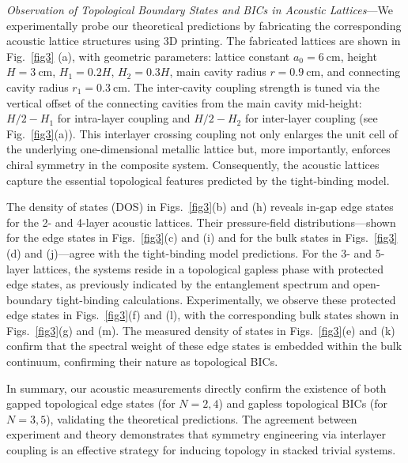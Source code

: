 \documentclass[twocolumn,english,prl,epsfig,rotate,showpacs,aps, superscriptaddress]{revtex4-2}
\newcommand{\blue}{\color{black}}
\begin{document}
\textit{Observation of Topological Boundary States and BICs in Acoustic Lattices}---We experimentally probe our theoretical predictions by fabricating the corresponding acoustic lattice structures using 3D printing. The fabricated lattices are shown in Fig.~\ref{fig3} (a), with geometric parameters: lattice constant $a_0 = 6\ \text{cm}$, height $H = 3\ \text{cm}$, $H_1=0.2H$, $H_2=0.3H$, main cavity radius $r = 0.9\ \text{cm}$, and connecting cavity radius $r_1 = 0.3\ \text{cm}$. The inter-cavity coupling strength is tuned via the vertical offset of the connecting cavities from the main cavity mid-height: $H/2 - H_1$ for intra-layer coupling and $H/2 - H_2$ for inter-layer coupling (see Fig.~\ref{fig3}(a)). This interlayer crossing coupling not only enlarges the unit cell of the underlying one-dimensional metallic lattice but, more importantly, enforces chiral symmetry in the composite system. Consequently, the acoustic lattices capture the essential topological features predicted by the tight-binding model.

{\blue{To experimentally map these states, acoustic waves are injected using a localized single-point source (a loudspeaker). As denoted by the speaker icons in Fig. 4(a), this source is strategically positioned at either the lattice boundary or the lattice center to selectively excite the topological edge states or the bulk continuum modes, respectively. The resulting steady-state spatial acoustic pressure-field profiles are then mapped by systematically scanning a probe microphone through the main cavities across the entire structure.}}

The density of states (DOS) in Figs.~\ref{fig3}(b) and (h) reveals in-gap edge states for the 2- and 4-layer acoustic lattices. Their pressure-field distributions---shown for the edge states in Figs.~\ref{fig3}(c) and (i) and for the bulk states in Figs.~\ref{fig3}(d) and (j)---agree with the tight-binding model predictions. For the 3- and 5-layer lattices, the systems reside in a topological gapless phase with protected edge states, as previously indicated by the entanglement spectrum and open-boundary tight-binding calculations. Experimentally, we observe these protected edge states in Figs.~\ref{fig3}(f) and (l), with the corresponding bulk states shown in Figs.~\ref{fig3}(g) and (m). The measured density of states in Figs.~\ref{fig3}(e) and (k) confirm that the spectral weight of these edge states is embedded within the bulk continuum, confirming their nature as topological BICs.

In summary, our acoustic measurements directly confirm the existence of both gapped topological edge states (for $N=2,4$) and gapless topological BICs (for $N=3,5$), validating the theoretical predictions. The agreement between experiment and theory demonstrates that symmetry engineering via interlayer coupling is an effective strategy for inducing topology in stacked trivial systems.
\end{document}
